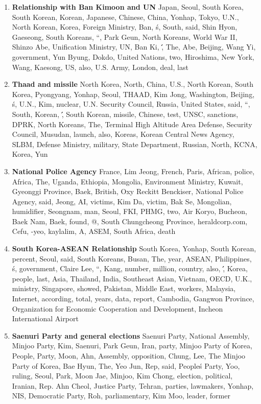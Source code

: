 \begin{enumerate}
  \item \textbf{Relationship with Ban Kimoon and UN} Japan, Seoul, South Korea, South Korean, Korean, Japanese, Chinese, China, Yonhap, Tokyo, U.N., North Korean, Korea, Foreign Ministry, Ban, \'s, South, said, Shin Hyon, Gaeseong, South Koreans, ``, Park Geun, North Koreans, World War II, Shinzo Abe, Unification Ministry, UN, Ban Ki, \'\', The, Abe, Beijing, Wang Yi, government, Yun Byung, Dokdo, United Nations, two, Hiroshima, New York, Wang, Kaesong, US, also, U.S. Army, London, deal, last
  \item \textbf{Thaad and missile} North Korea, North, China, U.S., North Korean, South Korea, Pyongyang, Yonhap, Seoul, THAAD, Kim Jong, Washington, Beijing, \'s, U.N., Kim, nuclear, U.N. Security Council, Russia, United States, said, ``, South, Korean, \'\', South Korean, missile, Chinese, test, UNSC, sanctions, DPRK, North Koreans, The, Terminal High Altitude Area Defense, Security Council, Musudan, launch, also, Koreas, Korean Central News Agency, SLBM, Defense Ministry, military, State Department, Russian, North, KCNA, Korea, Yun
  \item \textbf{National Police Agency} France, Lim Jeong, French, Paris, African, police, Africa, The, Uganda, Ethiopia, Mongolia, Environment Ministry, Kuwait, Gyeonggi Province, Baek, British, Oxy Reckitt Benckiser, National Police Agency, said, Jeong, AI, victims, Kim Da, victim, Bak Se, Mongolian, humidifier, Seongnam, man, Seoul, FKI, PHMG, two, Air Koryo, Bucheon, Baek Nam, Baek, found, @, South Chungcheong Province, heraldcorp.com, Cefu, -yeo, kaylalim, A, ASEM, South Africa, death
  \item \textbf{South Korea-ASEAN Relationship} South Korea, Yonhap, South Korean, percent, Seoul, said, South Koreans, Busan, The, year, ASEAN, Philippines, \'s, government, Claire Lee, ``, Kang, number, million, country, also, \'\', Korea, people, last, Asia, Thailand, India, Southeast Asian, Vietnam, OECD, U.K., ministry, Singapore, showed, Pakistan, Middle East, workers, Malaysia, Internet, according, total, years, data, report, Cambodia, Gangwon Province, Organization for Economic Cooperation and Development, Incheon International Airport
  \item \textbf{Saenuri Party and general elections} Saenuri Party, National Assembly, Minjoo Party, Kim, Saenuri, Park Geun, Iran, party, Minjoo Party of Korea, People, Party, Moon, Ahn, Assembly, opposition, Chung, Lee, The Minjoo Party of Korea, Bae Hyun, The, Yeo Jun, Rep, said, People\'s Party, Yoo, ruling, Seoul, Park, Moon Jae, Minjoo, Kim Chong, election, political, Iranian, Rep. Ahn Cheol, Justice Party, Tehran, parties, lawmakers, Yonhap, NIS, Democratic Party, Roh, parliamentary, Kim Moo, leader, former

\end{enumerate}
